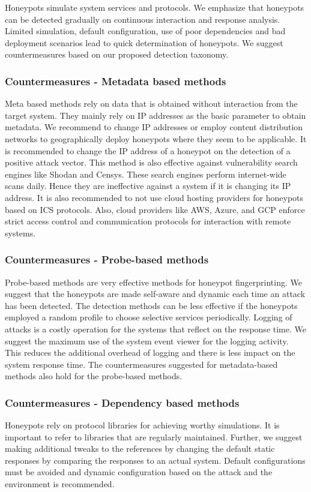 \documentclass[../main.tex]{subfiles}
\begin{document}
Honeypots simulate system services and protocols. We emphasize that honeypots can be detected gradually on continuous interaction and response analysis. Limited simulation, default configuration, use of poor dependencies and bad deployment scenarios lead to quick determination of honeypots. We suggest countermeasures based on our proposed detection taxonomy. 

\subsubsection{Countermeasures - Metadata based methods}
Meta based methods rely on data that is obtained without interaction from the target system. They mainly rely on IP addresses as the basic parameter to obtain metadata. We recommend to change IP addresses or employ content distribution networks to geographically deploy honeypots where they seem to be applicable.  It is recommended to change the IP address of a honeypot on the detection of a positive attack vector. This method is also effective against vulnerability search engines like Shodan and Censys. These search engines perform internet-wide scans daily. Hence they are ineffective against a system if it is changing its IP address. It is also recommended to not use cloud hosting providers for honeypots based on ICS protocols. Also, cloud providers like AWS, Azure, and GCP enforce strict access control and communication protocols for interaction with remote systems. 


\subsubsection{Countermeasures - Probe-based methods}
Probe-based methods are very effective methods for honeypot fingerprinting. We suggest that the honeypots are made self-aware and dynamic each time an attack has been detected. The detection methods can be less effective if the honeypots employed a random profile to choose selective services periodically.  Logging of attacks is a costly operation for the systems that reflect on the response time. We suggest the maximum use of the system event viewer for the logging activity. This reduces the additional overhead of logging and there is less impact on the system response time. The countermeasures suggested for metadata-based methods also hold for the probe-based methods. 

\subsubsection{Countermeasures - Dependency based methods}
Honeypots rely on protocol libraries for achieving worthy simulations. It is important to refer to libraries that are regularly maintained. Further, we suggest making additional tweaks to the references by changing the default static responses by comparing the responses to an actual system. Default configurations must be avoided and dynamic configuration based on the attack and the environment is recommended. 
\end{document}
